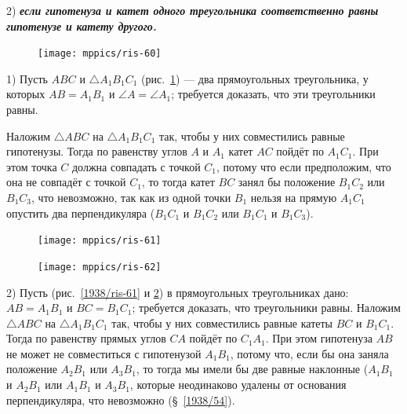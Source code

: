 2) \textbf{\emph{если гипотенуза и катет одного треугольника соответственно равны гипотенузе и катету другого.}}

\begin{figure}[h!]
\centering
\texttt{[image: mppics/ris-60]}
\caption{}\label{1938/ris-60}
\end{figure}

1) Пусть $ABC$ и $\triangle A_1B_1C_1$ (рис.~\ref{1938/ris-60}) — два прямоугольных треугольника, у которых $AB=A_1B_1$ и $\angle A = \angle A_1$;
требуется доказать, что эти треугольники равны.

Наложим $\triangle ABC$ на $\triangle A_1B_1C_1$ так, чтобы у них совместились равные гипотенузы.
Тогда по равенству углов $A$ и $A_1$ катет $AC$ пойдёт по $A_1C_1$.
При этом точка $C$ должна совпадать с точкой $C_1$, потому что если предположим, что она не совпадёт с точкой $C_1$, то тогда катет $BC$ занял бы положение $B_1C_2$ или $B_1C_3$, что невозможно, так как из одной точки $B_1$ нельзя на прямую $A_1C_1$ опустить два перпендикуляра ($B_1C_1$ и $B_1C_2$ или $B_1C_1$ и $B_1C_3$).

\begin{figure}[h!]
\begin{minipage}{.48\textwidth}
\centering
\texttt{[image: mppics/ris-61]}
\end{minipage}\hfill
\begin{minipage}{.48\textwidth}
\centering
\texttt{[image: mppics/ris-62]}
\end{minipage}

\medskip

\begin{minipage}{.48\textwidth}
\centering
\caption{}\label{1938/ris-61}
\end{minipage}\hfill
\begin{minipage}{.48\textwidth}
\centering
\caption{}\label{1938/ris-62}
\end{minipage}
\vskip-4mm
\end{figure}



2) Пусть (рис.~\ref{1938/ris-61} и \ref{1938/ris-62}) в прямоугольных треугольниках дано:
$AB=A_1B_1$ и $BC=B_1C_1$;
требуется доказать, что треугольники равны.
Наложим $\triangle ABC$ на $\triangle A_1B_1C_1$ так, чтобы у них совместились равные катеты $BC$ и $B_1C_1$.
Тогда по равенству прямых углов $CA$ пойдёт по $C_1A_1$.
При этом гипотенуза $AB$ не может не совместиться с гипотенузой $A_1B_1$, потому что, если бы она заняла положение $A_2B_1$ или $A_3B_1$, то тогда мы имели бы две равные наклонные ($A_1B_1$ и $A_2B_1$ или $A_1B_1$ и $A_3B_1$, которые неодинаково удалены от основания перпендикуляра, что невозможно (§~\ref{1938/54}).

